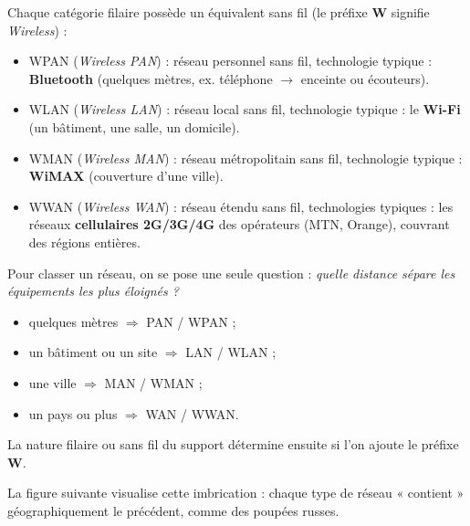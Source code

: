 \documentclass[11pt]{article}
\newcommand{\cle}[1]{{\popxbold\color{popdark}#1}}
\begin{document}
\begin{definition}
Chaque catégorie filaire possède un équivalent sans fil (le préfixe \textbf{W} signifie \emph{Wireless}) :
\begin{itemize}
\item \cle{WPAN} (\emph{Wireless PAN}) : réseau personnel sans fil, technologie typique : \textbf{Bluetooth} (quelques mètres, ex. téléphone $\to$ enceinte ou écouteurs).
\item \cle{WLAN} (\emph{Wireless LAN}) : réseau local sans fil, technologie typique : le \textbf{Wi-Fi} (un bâtiment, une salle, un domicile).
\item \cle{WMAN} (\emph{Wireless MAN}) : réseau métropolitain sans fil, technologie typique : \textbf{WiMAX} (couverture d'une ville).
\item \cle{WWAN} (\emph{Wireless WAN}) : réseau étendu sans fil, technologies typiques : les réseaux \textbf{cellulaires 2G/3G/4G} des opérateurs (MTN, Orange), couvrant des régions entières.
\end{itemize}
\end{definition}

\begin{propriete}
Pour classer un réseau, on se pose une seule question : \emph{quelle distance sépare les équipements les plus éloignés ?}
\begin{itemize}
\item quelques mètres $\Rightarrow$ PAN / WPAN ;
\item un bâtiment ou un site $\Rightarrow$ LAN / WLAN ;
\item une ville $\Rightarrow$ MAN / WMAN ;
\item un pays ou plus $\Rightarrow$ WAN / WWAN.
\end{itemize}
La nature filaire ou sans fil du support détermine ensuite si l'on ajoute le préfixe \textbf{W}.
\end{propriete}

La figure suivante visualise cette imbrication : chaque type de réseau « contient » géographiquement le précédent, comme des poupées russes.
\end{document}
